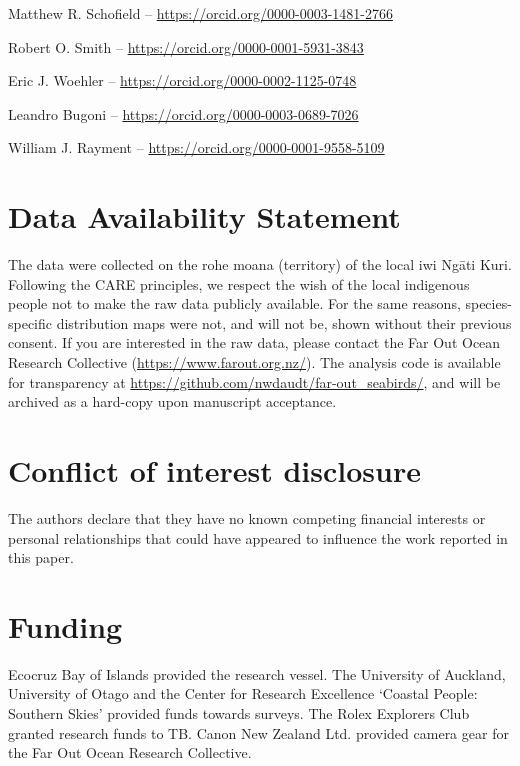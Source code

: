 \documentclass[preprint, 3p, authoryear]{elsarticle} %
\begin{document}
Matthew R. Schofield -- \url{https://orcid.org/0000-0003-1481-2766}

Robert O. Smith -- \url{https://orcid.org/0000-0001-5931-3843}

Eric J. Woehler -- \url{https://orcid.org/0000-0002-1125-0748}

Leandro Bugoni -- \url{https://orcid.org/0000-0003-0689-7026}

William J. Rayment -- \url{https://orcid.org/0000-0001-9558-5109}


\hypertarget{data-availability-statement}{%
\section*{Data Availability Statement}\label{data-availability-statement}}

The data were collected on the rohe moana (territory) of the local iwi Ng\={a}ti Kuri. Following the CARE principles, we respect the wish of the local indigenous people not to make the raw data publicly available. For the same reasons, species-specific distribution maps were not, and will not be, shown without their previous consent. If you are interested in the raw data, please contact the Far Out Ocean Research Collective (\url{https://www.farout.org.nz/}). The analysis code is available for transparency at \url{https://github.com/nwdaudt/far-out_seabirds/}, and will be archived as a hard-copy upon manuscript acceptance.

\hypertarget{conflict-of-interest-disclosure}{%
\section*{Conflict of interest disclosure}\label{conflict-of-interest-disclosure}}

The authors declare that they have no known competing financial interests or personal relationships that could have appeared to influence the work reported in this paper.

\hypertarget{funding}{%
\section*{Funding}\label{funding}}

Ecocruz Bay of Islands provided the research vessel. The University of Auckland, University of Otago and the Center for Research Excellence `Coastal People: Southern Skies' provided funds towards surveys. The Rolex Explorers Club granted research funds to TB. Canon New Zealand Ltd. provided camera gear for the Far Out Ocean Research Collective.
\end{document}
